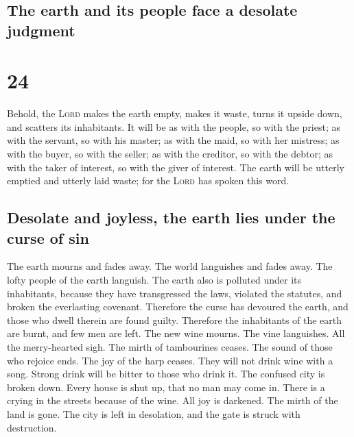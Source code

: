 \hypertarget{the-earth-and-its-people-face-a-desolate-judgment}{%
\subsection{The earth and its people face a desolate
judgment}\label{the-earth-and-its-people-face-a-desolate-judgment}}

\hypertarget{section-23}{%
\section{24}\label{section-23}}

 Behold, the \textsc{Lord} makes the earth empty, makes it
waste, turns it upside down, and scatters its inhabitants.
 It will be as with the people, so with the priest; as
with the servant, so with his master; as with the maid, so with her
mistress; as with the buyer, so with the seller; as with the creditor,
so with the debtor; as with the taker of interest, so with the giver of
interest.  The earth will be utterly emptied and utterly
laid waste; for the \textsc{Lord} has spoken this word.

\hypertarget{desolate-and-joyless-the-earth-lies-under-the-curse-of-sin}{%
\subsection{Desolate and joyless, the earth lies under the curse of
sin}\label{desolate-and-joyless-the-earth-lies-under-the-curse-of-sin}}

 The earth mourns and fades away. The world languishes and
fades away. The lofty people of the earth languish.  The
earth also is polluted under its inhabitants, because they have
transgressed the laws, violated the statutes, and broken the everlasting
covenant.  Therefore the curse has devoured the earth, and
those who dwell therein are found guilty. Therefore the inhabitants of
the earth are burnt, and few men are left.  The new wine
mourns. The vine languishes. All the merry-hearted sigh. 
The mirth of tambourines ceases. The sound of those who rejoice ends.
The joy of the harp ceases.  They will not drink wine with
a song. Strong drink will be bitter to those who drink it.
 The confused city is broken down. Every house is shut
up, that no man may come in.  There is a crying in the
streets because of the wine. All joy is darkened. The mirth of the land
is gone.  The city is left in desolation, and the gate is
struck with destruction.

